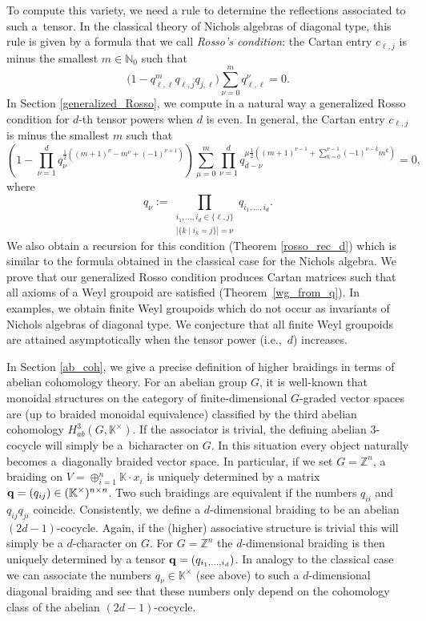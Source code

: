 \documentclass[pdftex]{sigma}
\numberwithin{equation}{section}
\newcommand{\NN }{\mathbb{N}}
\newcommand{\ZZ }{\mathbb{Z}}
\newcommand{\qq }{{\bf q}}
\newcommand{\KK }{\mathbb{K}}
\newcommand{\dn }{d}
\begin{document}
To compute this variety, we need a rule to determine the reflections associated to such a~tensor. In the classical theory of Nichols algebras of diagonal type, this rule is given by a formula that we call \emph{Rosso's condition}:
the Cartan entry $c_{\ell,j}$ is minus the smallest $m\in\NN_0$ such that
\begin{equation*}
\big(1-q_{\ell,\ell}^{m} q_{\ell,j}q_{j,\ell}\big) \sum_{\nu=0}^{m} q_{\ell,\ell}^\nu = 0.
\end{equation*}
In Section \ref{generalized_Rosso}, we compute in a natural way a generalized Rosso condition for $d$-th tensor powers when $d$ is even.
In general, the Cartan entry $c_{\ell,j}$ is minus the smallest $m$ such that
\begin{equation*}
\left(1-\prod_{\nu=1}^{\dn} q_\nu^{\frac{1}{2}((m+1)^{\nu}-m^{\nu}+(-1)^{\nu+1})}\right)
\sum_{\mu=0}^m \prod_{\nu=1}^d q_{\dn-\nu}^{\mu \frac{1}{2}\left( (m+1)^{\nu-1}+\sum_{k=0}^{\nu-1} (-1)^{\nu-k} m^k \right)}
= 0,
\end{equation*}
where
\[
q_\nu :=\prod_{\substack{i_1,\dots,i_\dn\in\{\ell,j\}\\ |\{k \mid i_k=j\}|=\nu}} q_{i_1,\dots,i_\dn}.
\]
We also obtain a recursion for this condition (Theorem \ref{rosso_rec_d}) which is similar to the formula obtained in the classical case for the Nichols algebra.
We prove that our generalized Rosso condition produces Cartan matrices such that all axioms of a Weyl groupoid are satisfied (Theo\-rem~\ref{wg_from_q}). In examples, we obtain finite Weyl groupoids which do not occur as invariants of Nichols algebras of diagonal type. We conjecture that all finite Weyl groupoids are attained asymptotically when the tensor power (i.e.,~$d$) increases.

In Section \ref{ab_coh}, we give a precise definition of higher braidings in terms of abelian cohomology theory.
For an abelian group $G$, it is well-known that monoidal structures on the category of finite-dimensional $G$-graded vector spaces are (up to braided monoidal equivalence) classified by the third abelian cohomology $H_{ab}^3(G,\KK^\times)$.
If the associator is trivial, the defining abelian $3$-cocycle will simply be a~bicharacter on $G$. In this situation every object naturally becomes a~diagonally braided vector space.
In particular, if we set $G=\ZZ^n$, a braiding on $V=\oplus_{i=1}^n \KK \cdot x_i$ is uniquely determined by a matrix $\qq=(q_{ij})\in (\KK^\times)^{n \times n}$.
Two such braidings are equivalent if the numbers $q_{ii}$ and $q_{ij}q_{ji}$ coincide.
Consistently, we define a $d$-dimensional braiding to be an abelian $(2d-1)$-cocycle. Again, if the (higher) associative structure is trivial this will simply be a $d$-character on $G$. For $G=\ZZ^n$ the $d$-dimensional braiding is then
uniquely determined by a tensor $\qq=(q_{i_1,\dots,i_d})$. In analogy to the classical case we can associate the numbers $q_\nu \in \KK^\times$ (see above) to such a $d$-dimensional diagonal braiding and see that these numbers only depend on the cohomology class of the abelian $(2d-1)$-cocycle.
\end{document}
